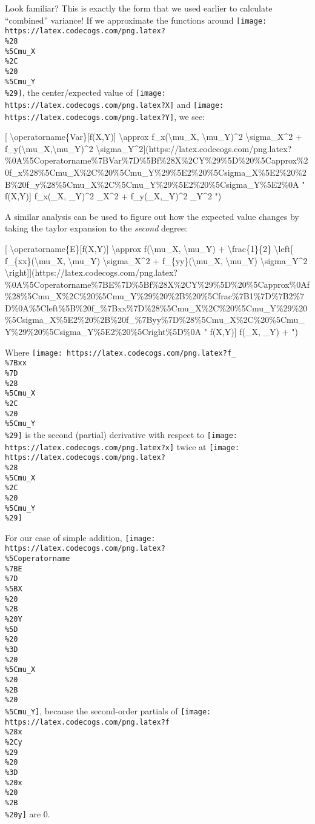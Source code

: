 \documentclass[]{article}
\begin{document}
Look familiar? This is exactly the form that we used earlier to calculate
``combined'' variance! If we approximate the functions around
\texttt{[image: https://latex.codecogs.com/png.latex?\\\%28\\\%5Cmu\_X\\\%2C\\\%20\\\%5Cmu\_Y\\\%29]},
the center/expected value of
\texttt{[image: https://latex.codecogs.com/png.latex?X]} and
\texttt{[image: https://latex.codecogs.com/png.latex?Y]}, we see:

{[} \textbackslash operatorname\{Var\}{[}f(X,Y){]} \textbackslash approx
f\_x(\textbackslash mu\_X, \textbackslash mu\_Y)\^{}2
\textbackslash sigma\_X\^{}2 +
f\_y(\textbackslash mu\_X,\textbackslash mu\_Y)\^{}2
\textbackslash sigma\_Y\^{}2{]}(https://latex.codecogs.com/png.latex?\%0A\%5Coperatorname\%7BVar\%7D\%5Bf\%28X\%2CY\%29\%5D\%20\%5Capprox\%20f\_x\%28\%5Cmu\_X\%2C\%20\%5Cmu\_Y\%29\%5E2\%20\%5Csigma\_X\%5E2\%20\%2B\%20f\_y\%28\%5Cmu\_X\%2C\%5Cmu\_Y\%29\%5E2\%20\%5Csigma\_Y\%5E2\%0A
" \operatorname{Var}{[}f(X,Y){]} \approx f\_x(\mu\_X, \mu\_Y)\^{}2
\sigma\_X\^{}2 + f\_y(\mu\_X,\mu\_Y)\^{}2 \sigma\_Y\^{}2 ")

A similar analysis can be used to figure out how the expected value changes by
taking the taylor expansion to the \emph{second} degree:

{[} \textbackslash operatorname\{E\}{[}f(X,Y){]} \textbackslash approx
f(\textbackslash mu\_X, \textbackslash mu\_Y) + \textbackslash frac\{1\}\{2\}
\textbackslash left{[} f\_\{xx\}(\textbackslash mu\_X, \textbackslash mu\_Y)
\textbackslash sigma\_X\^{}2 + f\_\{yy\}(\textbackslash mu\_X,
\textbackslash mu\_Y) \textbackslash sigma\_Y\^{}2
\textbackslash right{]}{]}(https://latex.codecogs.com/png.latex?\%0A\%5Coperatorname\%7BE\%7D\%5Bf\%28X\%2CY\%29\%5D\%20\%5Capprox\%0Af\%28\%5Cmu\_X\%2C\%20\%5Cmu\_Y\%29\%20\%2B\%20\%5Cfrac\%7B1\%7D\%7B2\%7D\%0A\%5Cleft\%5B\%20f\_\%7Bxx\%7D\%28\%5Cmu\_X\%2C\%20\%5Cmu\_Y\%29\%20\%5Csigma\_X\%5E2\%20\%2B\%20f\_\%7Byy\%7D\%28\%5Cmu\_X\%2C\%20\%5Cmu\_Y\%29\%20\%5Csigma\_Y\%5E2\%20\%5Cright\%5D\%0A
" \operatorname{E}{[}f(X,Y){]} \approx f(\mu\_X, \mu\_Y) + 
")

Where
\texttt{[image: https://latex.codecogs.com/png.latex?f\_\\\%7Bxx\\\%7D\\\%28\\\%5Cmu\_X\\\%2C\\\%20\\\%5Cmu\_Y\\\%29]}
is the second (partial) derivative with respect to
\texttt{[image: https://latex.codecogs.com/png.latex?x]} twice at
\texttt{[image: https://latex.codecogs.com/png.latex?\\\%28\\\%5Cmu\_X\\\%2C\\\%20\\\%5Cmu\_Y\\\%29]}

For our case of simple addition,
\texttt{[image: https://latex.codecogs.com/png.latex?\\\%5Coperatorname\\\%7BE\\\%7D\\\%5BX\\\%20\\\%2B\\\%20Y\\\%5D\\\%20\\\%3D\\\%20\\\%5Cmu\_X\\\%20\\\%2B\\\%20\\\%5Cmu\_Y]},
because the second-order partials of
\texttt{[image: https://latex.codecogs.com/png.latex?f\\\%28x\\\%2Cy\\\%29\\\%20\\\%3D\\\%20x\\\%20\\\%2B\\\%20y]}
are 0.
\end{document}
